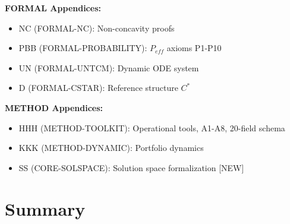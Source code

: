 \textbf{FORMAL Appendices:}
\begin{itemize}[nosep]
\item NC (FORMAL-NC): Non-concavity proofs
\item PBB (FORMAL-PROBABILITY): $P_{eff}$ axioms P1-P10
\item UN (FORMAL-UNTCM): Dynamic ODE system
\item D (FORMAL-CSTAR): Reference structure $C^*$
\end{itemize}

\textbf{METHOD Appendices:}
\begin{itemize}[nosep]
\item HHH (METHOD-TOOLKIT): Operational tools, A1-A8, 20-field schema
\item KKK (METHOD-DYNAMIC): Portfolio dynamics
\item SS (CORE-SOLSPACE): Solution space formalization [NEW]
\end{itemize}

\section{Summary}
\label{sec:mp-summary}

